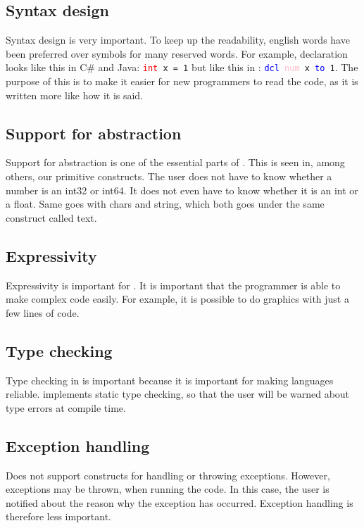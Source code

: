 \subsection*{Syntax design}
Syntax design is very important. To keep up the readability, english words have been preferred over symbols for many reserved words. For example, declaration looks like this in C\# and Java: \texttt{\textcolor{red}{int} x = 1} but like this in \lang{}: \texttt{\textcolor{blue}{dcl} \textcolor{pink}{num} x \textcolor{blue}{to} 1}. The purpose of this is to make it easier for new programmers to read the code, as it is written more like how it is said.

\subsection*{Support for abstraction}
Support for abstraction is one of the essential parts of \lang{}. This is seen in, among others, our primitive constructs. The user does not have to know whether a number is an int32 or int64. It does not even have to know whether it is an int or a float. Same goes with chars and string, which both goes under the same construct called text.

\subsection*{Expressivity}
Expressivity is important for \lang{}. It is important that the programmer is able to make complex code easily. For example, it is possible to do graphics with just a few lines of code.

\subsection*{Type checking}
Type checking in \lang{} is important because it is important for making languages reliable. \lang{} implements static type checking, so that the user will be warned about type errors at compile time.

\subsection*{Exception handling}
\lang{} Does not support constructs for handling or throwing exceptions. However, exceptions may be thrown, when running the code. In this case, the user is notified about the reason why the exception has occurred. Exception handling is therefore less important. 

